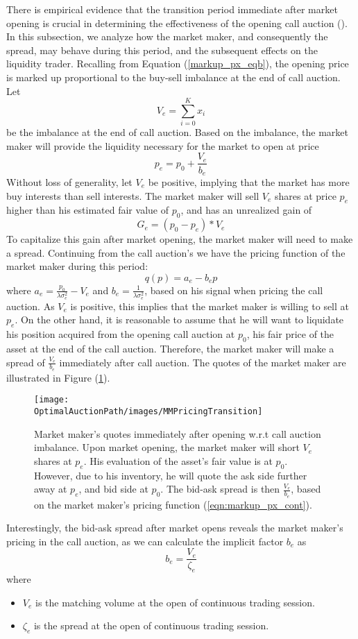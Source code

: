 There is empirical evidence that the transition period immediate after market opening is crucial in determining the effectiveness of the opening call auction (\cite{Pagano2013}). In this subsection, we analyze how the market maker, and consequently the spread, may behave during this period, and the subsequent effects on the liquidity trader. Recalling from Equation (\ref{markup_px_eqb}), the opening price is marked up proportional to the buy-sell imbalance at the end of call auction. Let
\[
  V_e = \sum_{i=0}^K x_i
\]
be the imbalance at the end of call auction. Based on the imbalance, the market maker will provide the liquidity necessary for the market to open at price
\[
  p_e = p_0 + \frac{V_e}{b_e}
\]
Without loss of generality, let $V_e$ be positive, implying that the market has more buy interests than sell interests. The market maker will sell $V_e$ shares at price $p_e$ higher than his estimated fair value of $p_0$, and has an unrealized gain of
\[
  G_e = (p_0 - p_e) * V_e
\]
To capitalize this gain after market opening, the market maker will need to make a spread. Continuing from the call auction's we have the pricing function of the market maker during this period:
\[
  q(p) = a_e - b_e p
\]
where $a_e = \frac{p_0}{\lambda \sigma_e^2} - V_e$ and $b_e=\frac{1}{\lambda \sigma_e^2}$, based on his signal when pricing the call auction. As $V_e$ is positive, this implies that the market maker is willing to sell at $p_e$. On the other hand, it is reasonable to assume that he will want to liquidate his position acquired from the opening call auction at $p_0$, his fair price of the asset at the end of the call auction. Therefore, the market maker will make a spread of $\frac{V_e}{b_e}$ immediately after call auction. The quotes of the market maker are illustrated in Figure (\ref{fig:mm_pricing_transition}).

\begin{figure}[h]
  \texttt{[image: \\OptimalAuctionPath/images/MMPricingTransition]}
  \caption{Market maker's quotes immediately after opening w.r.t call auction imbalance. Upon market opening, the market maker will short $V_e$ shares at $p_e$. His evaluation of the asset's fair value is at $p_0$. However, due to his inventory, he will quote the ask side further away at $p_e$, and bid side at $p_0$. The bid-ask spread is then $\frac{V_e}{b_e}$, based on the market maker's pricing function (\ref{eqn:markup_px_cont}).}
  \label{fig:mm_pricing_transition}
\end{figure}

Interestingly, the bid-ask spread after market opens reveals the market maker's pricing in the call
auction, as we can calculate the implicit factor $b_e$ as
\begin{equation}\label{eqn:expected_spread}
  b_e = \frac{V_e}{\zeta_e}
\end{equation}
where
\begin{itemize}
  \item $V_e$ is the matching volume at the open of continuous trading session.
  \item $\zeta_e$ is the spread at the open of continuous trading session.
\end{itemize}

